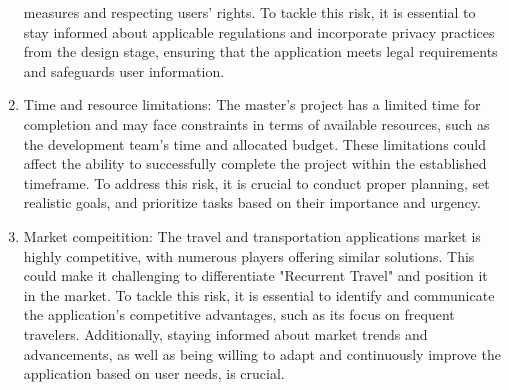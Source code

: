 \documentclass[../memory.tex]{subfiles}
\begin{document}
\begin{enumerate}
	      measures and respecting users' rights. To tackle this risk, it is
	      essential to stay informed about applicable regulations and incorporate
	      privacy practices from the design stage, ensuring that the application
	      meets legal requirements and safeguards user information.
	\item Time and resource limitations: The master's project has a limited time
	      for completion and may face constraints in terms of available resources,
	      such as the development team's time and allocated budget. These
	      limitations could affect the ability to successfully complete the project
	      within the established timeframe. To address this risk, it is crucial to
	      conduct proper planning, set realistic goals, and prioritize tasks based
	      on their importance and urgency.
	\item Market compeitition: The travel and transportation applications market
	      is highly competitive, with numerous players offering similar solutions.
	      This could make it challenging to differentiate "Recurrent Travel" and
	      position it in the market. To tackle this risk, it is essential to
	      identify and communicate the application's competitive advantages, such as
	      its focus on frequent travelers. Additionally, staying informed about
	      market trends and advancements, as well as being willing to adapt and
	      continuously improve the application based on user needs, is crucial.
\end{enumerate}
\end{document}
